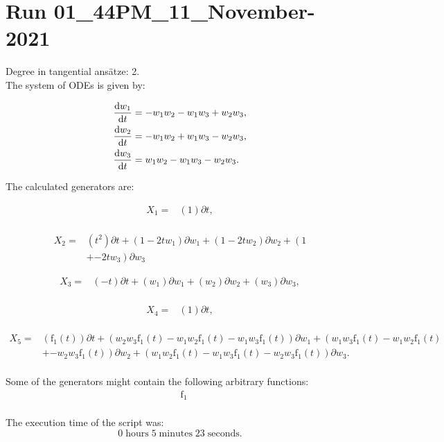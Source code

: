 \section*{Run 01\_44PM\_11\_November-2021}
Degree in tangential ansätze:	2.\\
The system of ODEs is given by:

\begin{align*}
\dv{w_{1}}{t}&=- w_{1} w_{2} - w_{1} w_{3} + w_{2} w_{3},\\
\dv{w_{2}}{t}&=- w_{1} w_{2} + w_{1} w_{3} - w_{2} w_{3},\\
\dv{w_{3}}{t}&=w_{1} w_{2} - w_{1} w_{3} - w_{2} w_{3}.\\
\end{align*}

\noindent The calculated generators are:

\begin{align*}
X_{1}=&\left(1 \right)\partial t,\\
\end{align*}

\begin{align*}
X_{2}=&\left(t^{2} \right)\partial t+\left(1- 2 t w_{1} \right)\partial w_{1}+\left(1- 2 t w_{2} \right)\partial w_{2}+\left(1\right.\\
&+\left.- 2 t w_{3} \right)\partial w_{3}
\end{align*}

\begin{align*}
X_{3}=&\left(- t \right)\partial t+\left(w_{1} \right)\partial w_{1}+\left(w_{2} \right)\partial w_{2}+\left(w_{3} \right)\partial w_{3},\\
\end{align*}

\begin{align*}
X_{4}=&\left(1 \right)\partial t,\\
\end{align*}

\begin{align*}
X_{5}=&\left(\operatorname{f_{1}}{\left(t \right)} \right)\partial t+\left(w_{2} w_{3} \operatorname{f_{1}}{\left(t \right)}- w_{1} w_{2} \operatorname{f_{1}}{\left(t \right)}- w_{1} w_{3} \operatorname{f_{1}}{\left(t \right)} \right)\partial w_{1}+\left(w_{1} w_{3} \operatorname{f_{1}}{\left(t \right)}- w_{1} w_{2} \operatorname{f_{1}}{\left(t \right)}\right.\\
&+\left.- w_{2} w_{3} \operatorname{f_{1}}{\left(t \right)} \right)\partial w_{2}+\left(w_{1} w_{2} \operatorname{f_{1}}{\left(t \right)} - w_{1} w_{3} \operatorname{f_{1}}{\left(t \right)} - w_{2} w_{3} \operatorname{f_{1}}{\left(t \right)} \right)\partial w_{3}.\\
\end{align*}



\noindent Some of the generators might contain the following arbitrary functions:
\begin{align*}
&\operatorname{f_{1}}\\
\end{align*}

\noindent The execution time of the script was:
$$0\;\mathrm{hours}\;5\;\mathrm{minutes}\;23 \;\mathrm{seconds}.$$
